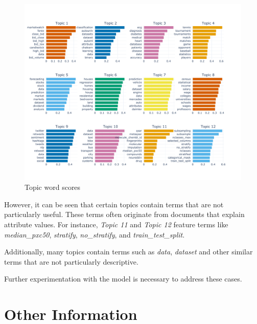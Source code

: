 \documentclass{article}
\begin{document}
\begin{figure}[h] %
    \centering
    \includegraphics[width=\textwidth]{images/topics_barchart.pdf}
    \caption{Topic word scores}
    \label{fig:topics_barchart}
\end{figure}

However, it can be seen that certain topics contain terms that are not particularly useful. These terms often originate from documents that explain attribute values. For instance, \textit{Topic 11} and \textit{Topic 12} feature terms like \textit{median\_pxc50}, \textit{stratify}, \textit{no\_stratify}, and \textit{train\_test\_split}.

Additionally, many topics contain terms such as \textit{data}, \textit{dataset} and other similar terms that are not particularly descriptive.

Further experimentation with the model is necessary to address these cases.






\section{Other Information}
\label{sec:other}
\end{document}
